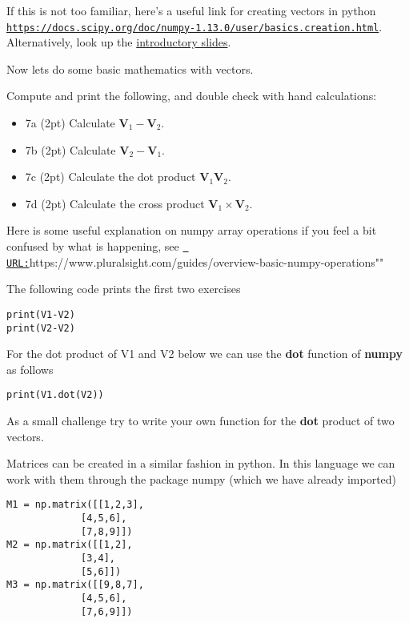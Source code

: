 \documentclass[%
oneside,                 %
final,                   %
10pt]{article}
\begin{document}
If this is not too familiar, here's a useful link for creating vectors in python \href{{https://docs.scipy.org/doc/numpy-1.13.0/user/basics.creation.html}}{\nolinkurl{https://docs.scipy.org/doc/numpy-1.13.0/user/basics.creation.html}}. Alternatively, look up the \href{{https://mhjensen.github.io/Physics321/doc/pub/Introduction/html/Introduction.html}}{introductory slides}.

Now lets do some basic mathematics with vectors.


Compute and print the following, and double check with hand calculations:

\begin{itemize}
\item 7a (2pt)  Calculate $\bm{V}_1-\bm{V}_2$.

\item 7b (2pt)  Calculate $\bm{V}_2-\bm{V}_1$.

\item 7c (2pt) Calculate the dot product $\bm{V}_1\bm{V}_2$.

\item 7d (2pt) Calculate the cross product $\bm{V}_1\times\bm{V}_2$.
\end{itemize}

\noindent
Here is some useful explanation on numpy array operations if you feel a bit confused by what is happening, see \href{{URL:}}{\nolinkurl{ URL:}}https://www.pluralsight.com/guides/overview-basic-numpy-operations""

The following code prints the first two exercises
\begin{verbatim}
print(V1-V2)
print(V2-V2)
\end{verbatim}

For the dot product of V1 and V2 below we can use the \textbf{dot} function of \textbf{numpy} as follows
\begin{verbatim}
print(V1.dot(V2))
\end{verbatim}
As a small challenge try to write your own function for the \textbf{dot} product of two vectors.

Matrices can be created in a similar fashion in python.  In this
language we can work with them through the package numpy (which we
have already imported)


\begin{verbatim}
M1 = np.matrix([[1,2,3],
             [4,5,6],
             [7,8,9]])
M2 = np.matrix([[1,2],
             [3,4],
             [5,6]])
M3 = np.matrix([[9,8,7],
             [4,5,6],
             [7,6,9]])
\end{verbatim}
\end{document}
